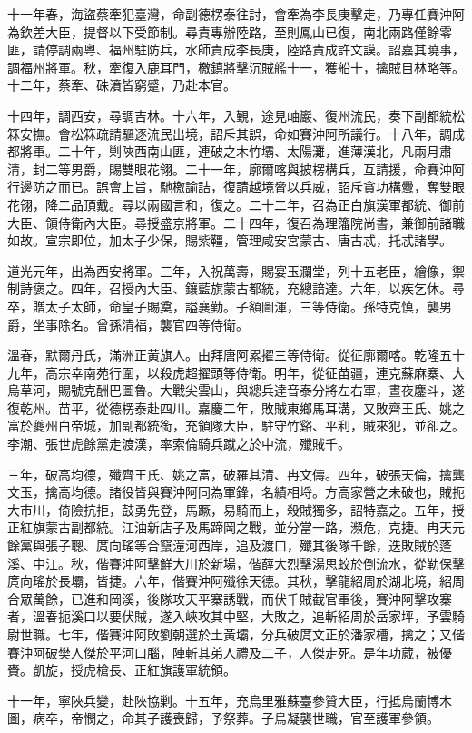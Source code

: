 \begin{pinyinscope}
十一年春，海盜蔡牽犯臺灣，命副德楞泰往討，會牽為李長庚擊走，乃專任賽沖阿為欽差大臣，提督以下受節制。尋責專辦陸路，至則鳳山已復，南北兩路僅餘零匪，請停調兩粵、福州駐防兵，水師責成李長庚，陸路責成許文謨。詔嘉其曉事，調福州將軍。秋，牽復入鹿耳門，檄鎮將擊沉賊艦十一，獲船十，擒賊目林略等。十二年，蔡牽、硃濆皆窮蹙，乃赴本官。

十四年，調西安，尋調吉林。十六年，入覲，途見岫巖、復州流民，奏下副都統松箖安撫。會松箖疏請驅逐流民出境，詔斥其誤，命如賽沖阿所議行。十八年，調成都將軍。二十年，剿陜西南山匪，連破之木竹壩、太陽灘，進薄漢北，凡兩月肅清，封二等男爵，賜雙眼花翎。二十一年，廓爾喀與披楞構兵，互請援，命賽沖阿行邊防之而已。誤會上旨，馳檄諭詰，復請越境脅以兵威，詔斥貪功構釁，奪雙眼花翎，降二品頂戴。尋以兩國言和，復之。二十二年，召為正白旗漢軍都統、御前大臣、領侍衛內大臣。尋授盛京將軍。二十四年，復召為理籓院尚書，兼御前諸職如故。宣宗即位，加太子少保，賜紫韁，管理咸安宮蒙古、唐古忒，托忒諸學。

道光元年，出為西安將軍。三年，入祝萬壽，賜宴玉瀾堂，列十五老臣，繪像，禦制詩褒之。四年，召授內大臣、鑲藍旗蒙古都統，充總諳達。六年，以疾乞休。尋卒，贈太子太師，命皇子賜奠，謚襄勤。子額圖渾，三等侍衛。孫特克慎，襲男爵，坐事除名。曾孫清福，襲官四等侍衛。

溫春，默爾丹氏，滿洲正黃旗人。由拜唐阿累擢三等侍衛。從征廓爾喀。乾隆五十九年，高宗幸南苑行圍，以殺虎超擢頭等侍衛。明年，從征苗疆，連克蘇麻寨、大烏草河，賜號克酬巴圖魯。大戰尖雲山，與總兵達音泰分將左右軍，晝夜鏖斗，遂復乾州。苗平，從德楞泰赴四川。嘉慶二年，敗賊東鄉馬耳溝，又敗齊王氏、姚之富於夔州白帝城，加副都統銜，充領隊大臣，駐守竹谿、平利，賊來犯，並卻之。李潮、張世虎餘黨走渡漢，率索倫騎兵蹴之於中流，殲賊千。

三年，破高均德，殲齊王氏、姚之富，破羅其清、冉文儔。四年，破張天倫，擒龔文玉，擒高均德。諸役皆與賽沖阿同為軍鋒，名績相埒。方高家營之未破也，賊扼大市川，倚險抗拒，鼓勇先登，馬蹶，易騎而上，殺賊獨多，詔特嘉之。五年，授正紅旗蒙古副都統。江油新店子及馬蹄岡之戰，並分當一路，瀕危，克捷。冉天元餘黨與張子聰、庹向瑤等合竄潼河西岸，追及渡口，殲其後隊千餘，迭敗賊於蓬溪、中江。秋，偕賽沖阿擊鮮大川於新場，偕薛大烈擊湯思蛟於倒流水，從勒保擊庹向瑤於長壩，皆捷。六年，偕賽沖阿殲徐天德。其秋，擊龍紹周於湖北境，紹周合眾萬餘，已進和岡溪，後隊攻天平寨誘戰，而伏千賊截官軍後，賽沖阿擊攻寨者，溫春扼溪口以要伏賊，遂入峽攻其中堅，大敗之，追斬紹周於岳家坪，予雲騎尉世職。七年，偕賽沖阿敗劉朝選於土黃壩，分兵破庹文正於潘家槽，擒之；又偕賽沖阿破樊人傑於平河口腦，陣斬其弟人禮及二子，人傑走死。是年功蕆，被優賚。凱旋，授虎槍長、正紅旗護軍統領。

十一年，寧陜兵變，赴陜協剿。十五年，充烏里雅蘇臺參贊大臣，行抵烏蘭博木圖，病卒，帝憫之，命其子護喪歸，予祭葬。子烏凝襲世職，官至護軍參領。


\end{pinyinscope}
